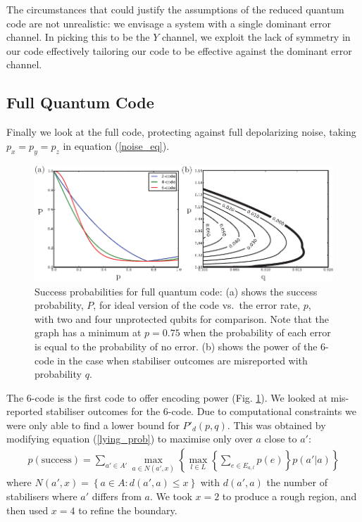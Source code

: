 The circumstances that could justify the assumptions of the reduced quantum code are not unrealistic: we envisage a system with a single dominant error channel. In picking this to be the $Y$ channel, we exploit the lack of symmetry in our code effectively tailoring our code to be effective against the dominant error channel.

\subsection{Full Quantum Code}

Finally we look at the full code, protecting against full depolarizing noise, taking $p_x = p_y = p_z$ in equation (\ref{noise_eq}). 

\begin{figure}[htb]
  \begin{center}
    \includegraphics{assets/full_results.pdf}
  \end{center}
  \caption{Success probabilities for full quantum code: (a) shows the success probability, $P$, for ideal version of the code vs.\ the error rate, $p$, with two and four unprotected qubits for comparison. Note that the graph has a minimum at $p=0.75$ when the probability of each error is equal to the probability of no error. (b) shows the power of the $6$-code in the case when stabiliser outcomes are misreported with probability $q$.}
  \label{full_results}
\end{figure}

The $6$-code is the first code to offer encoding power (Fig. \ref{full_results}). We looked at mis-reported stabiliser outcomes for the $6$-code. Due to computational constraints we were only able to find a lower bound for $P'_d(p, q)$. This was obtained by modifying equation (\ref{lying_prob}) to maximise only over $a$ close to $a'$:
\begin{align} \label{approx_eq}
  p(\text{success})= \sum_{a'\in A'} \max_{a \in N(a',x)} \left\{ \max_{l \in L} \left\{\sum_{e \in E_{a,l}} p(e) \right\} p(a' \vert a) \right\}
\end{align}
where $N(a', x) = \left\{a \in A : d(a', a) \leq x \right\}$ with $d(a', a)$ the number of stabilisers where $a'$ differs from $a$. We took $x = 2$ to produce a rough region, and then used $x=4$ to refine the boundary. 

